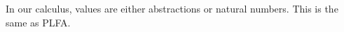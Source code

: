 \documentclass[a4paper,11pt]{article}
\begin{document}
In our calculus, values are either abstractions or natural numbers. This is the same as PLFA.
\begin{code}%
%
\>[2]\AgdaSpace{}%
\AgdaSpace{}%
\AgdaSymbol{:}\AgdaSpace{}%
\AgdaSpace{}%
\AgdaSpace{}%
\AgdaSpace{}%
\AgdaSpace{}%
\AgdaSpace{}%
\AgdaSpace{}%
\<%
\\
\>[2][@{}l@{\AgdaIndent{0}}]%
\>[4]\AgdaSpace{}%
\AgdaSymbol{:}\AgdaSpace{}%
\AgdaSymbol{(}\AgdaSpace{}%
\AgdaSymbol{:}\AgdaSpace{}%
\AgdaSpace{}%
\AgdaSymbol{(}\AgdaSpace{}%
\AgdaOperator{\AgdaInductiveConstructor{,}}\AgdaSpace{}%
\AgdaSymbol{)}\AgdaSpace{}%
\AgdaSpace{}%
\AgdaSymbol{)}\AgdaSpace{}%
\AgdaSpace{}%
\AgdaSpace{}%
\AgdaSymbol{\{}\AgdaSymbol{\}}\AgdaSpace{}%
\AgdaSymbol{\{}\AgdaSymbol{\}}\AgdaSpace{}%
\AgdaSymbol{(}\AgdaSpace{}%
\AgdaSymbol{)}\<%
\\
%
\>[4]\AgdaSpace{}%
\AgdaSymbol{:}\AgdaSpace{}%
\AgdaSpace{}%
\AgdaSymbol{\{}\AgdaSymbol{\}}\AgdaSpace{}%
\AgdaSymbol{\{}\AgdaSymbol{\}}\AgdaSpace{}%
\<%
\\
%
\>[4]\AgdaSpace{}%
\AgdaSymbol{:}\AgdaSpace{}%
\AgdaSymbol{\{}\AgdaSpace{}%
\AgdaSymbol{:}\AgdaSpace{}%
\AgdaSpace{}%
\AgdaSpace{}%
\AgdaSpace{}%
\AgdaSymbol{\}}\AgdaSpace{}%
\AgdaSpace{}%
\AgdaSpace{}%
\AgdaSpace{}%
\AgdaSpace{}%
\AgdaSpace{}%
\AgdaSymbol{(}\AgdaSpace{}%
\AgdaSymbol{)}\<%
\end{code}
\end{document}
